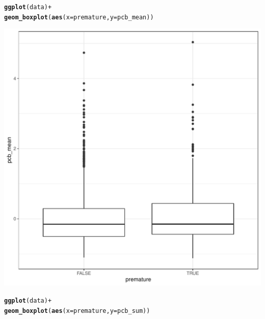 \documentclass{article}\usepackage[]{graphicx}\usepackage[]{color}
\makeatletter
\def\maxwidth{ %
  \ifdim\Gin@nat@width>\linewidth
    \linewidth
  \else
    \Gin@nat@width
  \fi
}
\newcommand{\hlopt}[1]{\textcolor[rgb]{0,0,0}{#1}}%
\newcommand{\hlstd}[1]{\textcolor[rgb]{0.345,0.345,0.345}{#1}}%
\newcommand{\hlkwc}[1]{\textcolor[rgb]{0.333,0.667,0.333}{#1}}%
\newcommand{\hlkwd}[1]{\textcolor[rgb]{0.737,0.353,0.396}{\textbf{#1}}}%
\newenvironment{kframe}{%
 \def\at@end@of@kframe{}%
 \ifinner\ifhmode%
  \def\at@end@of@kframe{\end{minipage}}%
  \begin{minipage}{\columnwidth}%
 \fi\fi%
 \def\FrameCommand##1{\hskip\@totalleftmargin \hskip-\fboxsep
 \colorbox{shadecolor}{##1}\hskip-\fboxsep
     \hskip-\linewidth \hskip-\@totalleftmargin \hskip\columnwidth}%
 \MakeFramed {\advance\hsize-\width
   \@totalleftmargin\z@ \linewidth\hsize
   \@setminipage}}%
 {\par\unskip\endMakeFramed%
 \at@end@of@kframe}
\newenvironment{knitrout}{}{} %
\makeatother
\begin{document}
\begin{knitrout}
\color{fgcolor}\begin{kframe}
\begin{alltt}
\hlkwd{ggplot}\hlstd{(data)} \hlopt{+}
  \hlkwd{geom_boxplot}\hlstd{(}\hlkwd{aes}\hlstd{(}\hlkwc{x}\hlstd{=premature,} \hlkwc{y}\hlstd{= pcb_mean))}
\end{alltt}


{\ttfamily\noindent\color{warningcolor}{\#\# Warning: Removed 1 rows containing non-finite values (stat\_boxplot).}}\end{kframe}
\includegraphics[width=\maxwidth]{figure/unnamed-chunk-11-1} 
\begin{kframe}\begin{alltt}
\hlkwd{ggplot}\hlstd{(data)} \hlopt{+}
  \hlkwd{geom_boxplot}\hlstd{(}\hlkwd{aes}\hlstd{(}\hlkwc{x}\hlstd{=premature,} \hlkwc{y}\hlstd{= pcb_sum))}
\end{alltt}



\end{kframe}
\end{knitrout}
\end{document}
